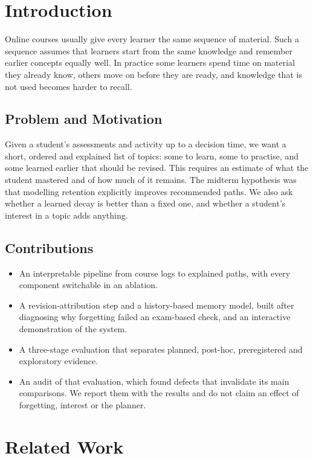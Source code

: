 \documentclass[conference]{IEEEtran}
\begin{document}
\section{Introduction}
Online courses usually give every learner the same sequence of material. Such a sequence assumes that learners start from the same knowledge and remember earlier concepts equally well. In practice some learners spend time on material they already know, others move on before they are ready, and knowledge that is not used becomes harder to recall.

\subsection{Problem and Motivation}
Given a student's assessments and activity up to a decision time, we want a short, ordered and explained list of topics: some to learn, some to practise, and some learned earlier that should be revised. This requires an estimate of what the student mastered and of how much of it remains. The midterm hypothesis was that modelling retention explicitly improves recommended paths. We also ask whether a learned decay is better than a fixed one, and whether a student's interest in a topic adds anything.

\subsection{Contributions}
\begin{itemize}
\item An interpretable pipeline from course logs to explained paths, with every component switchable in an ablation.
\item A revision-attribution step and a history-based memory model, built after diagnosing why forgetting failed an exam-based check, and an interactive demonstration of the system.
\item A three-stage evaluation that separates planned, post-hoc, preregistered and exploratory evidence.
\item An audit of that evaluation, which found defects that invalidate its main comparisons. We report them with the results and do not claim an effect of forgetting, interest or the planner.
\end{itemize}

\section{Related Work}
\end{document}
